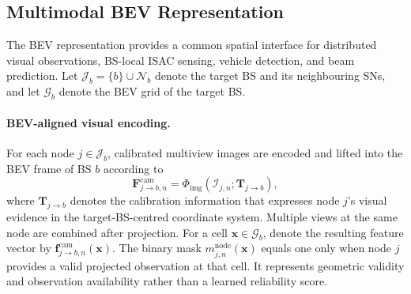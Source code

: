 \subsection{Multimodal BEV Representation}
\label{subsec:method-bev-representation}

The BEV representation provides a common spatial interface for distributed
visual observations, BS-local ISAC sensing, vehicle detection, and beam
prediction.  Let \(\mathcal{J}_b=\{b\}\cup\mathcal{N}_b\) denote the target BS
and its neighbouring SNs, and let \(\mathcal{G}_b\) denote the BEV grid of the
target BS.

\paragraph{BEV-aligned visual encoding.}
For each node \(j\in\mathcal{J}_b\), calibrated multiview images are encoded and
lifted into the BEV frame of BS \(b\) according to
\begin{equation}
    \mathbf{F}^{\mathrm{cam}}_{j\rightarrow b,n}
    =
    \Phi_{\mathrm{img}}\!
    \left(
    \mathcal{I}_{j,n};\mathbf{T}_{j\rightarrow b}
    \right),
    \label{eq:method-camera-lift}
\end{equation}
where \(\mathbf{T}_{j\rightarrow b}\) denotes the calibration information that
expresses node \(j\)'s visual evidence in the target-BS-centred coordinate
system.  Multiple views at the same node are combined after projection.  For a
cell \(\mathbf{x}\in\mathcal{G}_b\), denote the resulting feature vector by
\(\mathbf{f}^{\mathrm{cam}}_{j\rightarrow b,n}(\mathbf{x})\).  The binary mask
\(m^{\mathrm{node}}_{j,n}(\mathbf{x})\) equals one only when node \(j\) provides
a valid projected observation at that cell.  It represents geometric validity
and observation availability rather than a learned reliability score.

